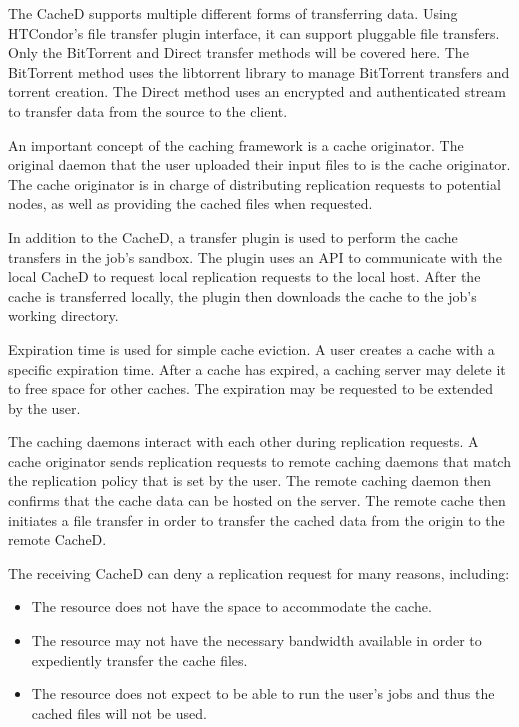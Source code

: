 \label{sec:cachedtransfermethods}
The CacheD supports multiple different forms of transferring data.  Using HTCondor's file transfer plugin interface, it can support pluggable file transfers.  Only the BitTorrent and Direct transfer methods will be covered here.  The BitTorrent method uses the libtorrent library to manage BitTorrent transfers and torrent creation.  The Direct method uses an encrypted and authenticated stream to transfer data from the source to the client.

An important concept of the caching framework is a cache originator.  The original daemon that the user uploaded their input files to is the cache originator.  The cache originator is in charge of distributing replication requests to potential nodes, as well as providing the cached files when requested.

In addition to the CacheD, a transfer plugin is used to perform the cache transfers in the job's sandbox.  The plugin uses an API to communicate with the local CacheD to request local replication requests to the local host.  After the cache is transferred locally, the plugin then downloads the cache to the job's working directory.

Expiration time is used for simple cache eviction.  A user creates a cache with a specific expiration time.  After a cache has expired, a caching server may delete it to free space for other caches.  The expiration may be requested to be extended by the user.

The caching daemons interact with each other during replication requests.  A cache originator sends replication requests to remote caching daemons that match the replication policy that is set by the user.  The remote caching daemon then confirms that the cache data can be hosted on the server.  The remote cache then initiates a file transfer in order to transfer the cached data from the origin to the remote CacheD.

The receiving CacheD can deny a replication request for many reasons, including:
\begin{itemize}
	\item The resource does not have the space to accommodate the cache.
	\item The resource may not have the necessary bandwidth available in order to expediently transfer the cache files.
	\item The resource does not expect to be able to run the user's jobs and thus the cached files will not be used.
\end{itemize}

